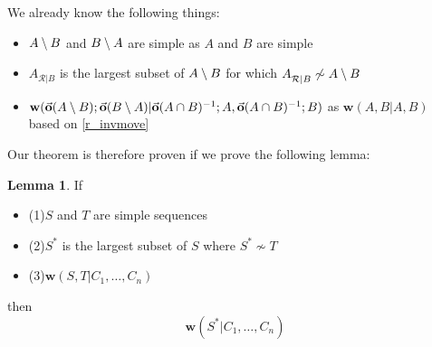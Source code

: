 \documentclass[12pt]{article}
\newcommand{\indep}{\not\sim}
\newcommand{\worksc}[2]{{\mathbf{w}}({#1}|{#2})}
\newcommand{\ordered}[1]{\vec{\mathbf{o}}({#1})}
\newcommand{\recchar}[3]{{#1}^{#3}_{\mathcal{R}|{#2}}}
\newcommand{\reca}{\recchar{A}{B}{}} %
\theoremstyle{definition}
\newtheorem{mylem}{Lemma}
\begin{document}
We already know the following things:
\begin{itemize}
\item $A\setminus B$ and $B\setminus A$ are simple as $A$ and $B$ are simple
\item $\reca$ is the largest subset of $A\setminus B$ for which $\reca\indep\amb$
\item $\worksc{\ordered{\amb};\ordered{\bma}}{\acbi;A,\acbi;B}$ as $\worksc{A,B}{A,B}$ based on \cref{r_invmove}
\end{itemize}

Our theorem is therefore proven if we prove the following lemma:

\begin{mylem}
If
   \begin{itemize}
   \item \newcommand{\condSimple}{(1)} \condSimple $S$ and $T$ are simple sequences
   \item \newcommand{\condApr}{(2)} \condApr $S^*$ is the largest subset of $S$ where $S^*\indep T$
   \item \newcommand{\condWork}{(3)} \condWork $\worksc{S,T}{C_1,\ldots,C_n}$
   \end{itemize}
then
\[ \worksc{S^*}{C_1,\ldots,C_n} \]
\end{mylem}
\end{document}
